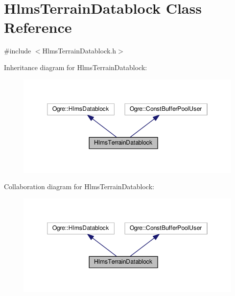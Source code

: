 \hypertarget{class_hlms_terrain_datablock}{}\section{Hlms\+Terrain\+Datablock Class Reference}
\label{class_hlms_terrain_datablock}


{\ttfamily \#include $<$Hlms\+Terrain\+Datablock.\+h$>$}



Inheritance diagram for Hlms\+Terrain\+Datablock\+:\nopagebreak
\begin{figure}[H]
\begin{center}
\leavevmode
\includegraphics[width=346pt]{class_hlms_terrain_datablock__inherit__graph}
\end{center}
\end{figure}


Collaboration diagram for Hlms\+Terrain\+Datablock\+:\nopagebreak
\begin{figure}[H]
\begin{center}
\leavevmode
\includegraphics[width=346pt]{class_hlms_terrain_datablock__coll__graph}
\end{center}
\end{figure}
